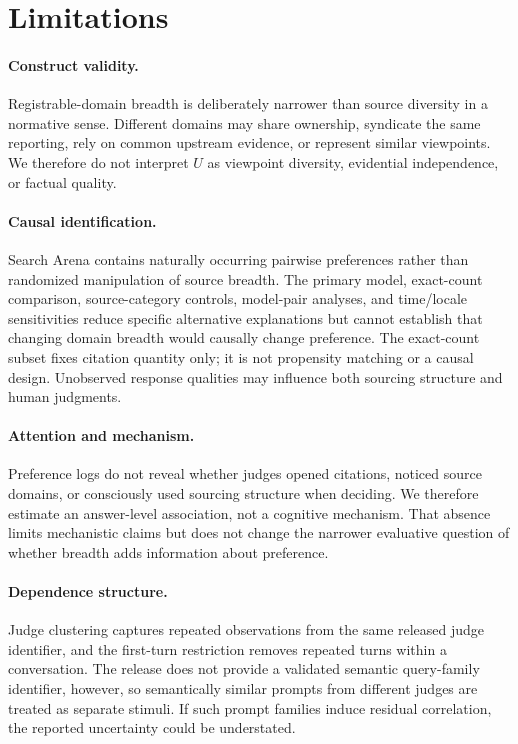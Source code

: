 \documentclass[sigconf,natbib=true,anonymous=true]{acmart}
\begin{document}
\section{Limitations}
\paragraph{Construct validity.}
Registrable-domain breadth is deliberately narrower than source diversity in a normative sense. Different domains may share ownership, syndicate the same reporting, rely on common upstream evidence, or represent similar viewpoints. We therefore do not interpret $U$ as viewpoint diversity, evidential independence, or factual quality.

\paragraph{Causal identification.}
Search Arena contains naturally occurring pairwise preferences rather than randomized manipulation of source breadth. The primary model, exact-count comparison, source-category controls, model-pair analyses, and time/locale sensitivities reduce specific alternative explanations but cannot establish that changing domain breadth would causally change preference. The exact-count subset fixes citation quantity only; it is not propensity matching or a causal design. Unobserved response qualities may influence both sourcing structure and human judgments.

\paragraph{Attention and mechanism.}
Preference logs do not reveal whether judges opened citations, noticed source domains, or consciously used sourcing structure when deciding. We therefore estimate an answer-level association, not a cognitive mechanism. That absence limits mechanistic claims but does not change the narrower evaluative question of whether breadth adds information about preference.

\paragraph{Dependence structure.}
Judge clustering captures repeated observations from the same released judge identifier, and the first-turn restriction removes repeated turns within a conversation. The release does not provide a validated semantic query-family identifier, however, so semantically similar prompts from different judges are treated as separate stimuli. If such prompt families induce residual correlation, the reported uncertainty could be understated.
\end{document}
